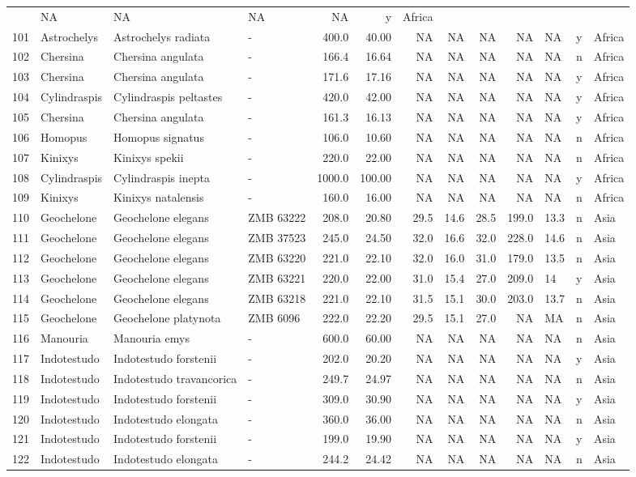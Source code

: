 \begin{landscape}
{\begin{longtable}[]{@{}llllrrrrrrlll@{}}
	& NA & NA & NA & NA & y & Africa\tabularnewline
	101 & Astrochelys & Astrochelys radiata & - & 400.0 & 40.00 & NA & NA &
	NA & NA & NA & y & Africa\tabularnewline
	102 & Chersina & Chersina angulata & - & 166.4 & 16.64 & NA & NA & NA &
	NA & NA & n & Africa\tabularnewline
	103 & Chersina & Chersina angulata & - & 171.6 & 17.16 & NA & NA & NA &
	NA & NA & y & Africa\tabularnewline
	104 & Cylindraspis & Cylindraspis peltastes & - & 420.0 & 42.00 & NA &
	NA & NA & NA & NA & y & Africa\tabularnewline
	105 & Chersina & Chersina angulata & - & 161.3 & 16.13 & NA & NA & NA &
	NA & NA & y & Africa\tabularnewline
	106 & Homopus & Homopus signatus & - & 106.0 & 10.60 & NA & NA & NA & NA
	& NA & n & Africa\tabularnewline
	107 & Kinixys & Kinixys spekii & - & 220.0 & 22.00 & NA & NA & NA & NA &
	NA & n & Africa\tabularnewline
	108 & Cylindraspis & Cylindraspis inepta & - & 1000.0 & 100.00 & NA & NA
	& NA & NA & NA & y & Africa\tabularnewline
	109 & Kinixys & Kinixys natalensis & - & 160.0 & 16.00 & NA & NA & NA &
	NA & NA & n & Africa\tabularnewline
	110 & Geochelone & Geochelone elegans & ZMB 63222 & 208.0 & 20.80 & 29.5
	& 14.6 & 28.5 & 199.0 & 13.3 & n & Asia\tabularnewline
	111 & Geochelone & Geochelone elegans & ZMB 37523 & 245.0 & 24.50 & 32.0
	& 16.6 & 32.0 & 228.0 & 14.6 & n & Asia\tabularnewline
	112 & Geochelone & Geochelone elegans & ZMB 63220 & 221.0 & 22.10 & 32.0
	& 16.0 & 31.0 & 179.0 & 13.5 & n & Asia\tabularnewline
	113 & Geochelone & Geochelone elegans & ZMB 63221 & 220.0 & 22.00 & 31.0
	& 15.4 & 27.0 & 209.0 & 14 & y & Asia\tabularnewline
	114 & Geochelone & Geochelone elegans & ZMB 63218 & 221.0 & 22.10 & 31.5
	& 15.1 & 30.0 & 203.0 & 13.7 & n & Asia\tabularnewline
	115 & Geochelone & Geochelone platynota & ZMB 6096 & 222.0 & 22.20 &
	29.5 & 15.1 & 27.0 & NA & MA & n & Asia\tabularnewline
	116 & Manouria & Manouria emys & - & 600.0 & 60.00 & NA & NA & NA & NA &
	NA & n & Asia\tabularnewline
	117 & Indotestudo & Indotestudo forstenii & - & 202.0 & 20.20 & NA & NA
	& NA & NA & NA & y & Asia\tabularnewline
	118 & Indotestudo & Indotestudo travancorica & - & 249.7 & 24.97 & NA &
	NA & NA & NA & NA & n & Asia\tabularnewline
	119 & Indotestudo & Indotestudo forstenii & - & 309.0 & 30.90 & NA & NA
	& NA & NA & NA & y & Asia\tabularnewline
	120 & Indotestudo & Indotestudo elongata & - & 360.0 & 36.00 & NA & NA &
	NA & NA & NA & n & Asia\tabularnewline
	121 & Indotestudo & Indotestudo forstenii & - & 199.0 & 19.90 & NA & NA
	& NA & NA & NA & y & Asia\tabularnewline
	122 & Indotestudo & Indotestudo elongata & - & 244.2 & 24.42 & NA & NA &
	NA & NA & NA & n & Asia\tabularnewline

\end{longtable}}
\end{landscape}
